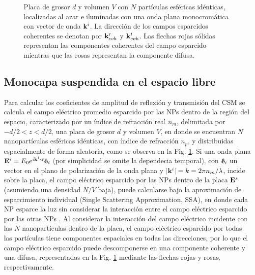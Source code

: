 \begin{figure}[h!]
	\caption{Placa de grosor $d$ y volumen $V$ con $N$ partículas esféricas  idénticas, localizadas al azar e iluminadas con una onda plana monocromática con vector de onda $\vb{k}^i$. La dirección de los campos esparcidos coherentes se denotan por $\vb{k}^r_{coh}$ y $\vb{k}^t_{coh}$. Las flechas rojas sólidas representan las componentes coherentes del campo esparcido mientras que las rosas representan la componente difusa. }\label{fig:CSM-Slab}
	\end{figure} 
 
\subsection{Monocapa suspendida en el espacio libre}
\label{ssection:FSM} 
 
Para calcular los coeficientes de amplitud de reflexión y transmisión del CSM se calcula el campo eléctrico promedio esparcido por las NPs dentro de la región del espacio, caracterizado por un índice de refracción real $n_m$, delimitada por  $-d/2<z<d/2$, una placa de grosor $d$ y volumen $V$, en donde se encuentran $N$ nanopartículas esféricas idénticas, con índice de refracción $n_p$, y distribuidas espacialmente de forma aleatoria, como se observa en la Fig. \ref{fig:CSM-Slab}. Si una onda plana $\vb{E}^i = E_0 e^{i\vb{k}^i\cdot\vb{r}}\vu{e}_i$ (por simplicidad se omite la dependecia temporal), con $\vu{e}_i$ un vector en el plano de polarización de la onda plana y $|\vb{k}^i| = k = 2\pi n_m /\lambda$, incide sobre la placa, el campo eléctrico esparcido  por las NPs dentro de la placa $\vb{E}^s$ (asumiendo una densidad $N/V$ baja), puede calcularse bajo la aproximación de esparcimiento individual (Single Scattering Approximation, SSA), en donde cada NP esparce la luz sin considerar la interacción entre el campo eléctrico esparcido por las otras NPs \cite{barrera2003coherent}. Al considerar la interacción del campo eléctrico incidente con las $N$ nanopartículas dentro de la placa, el campo eléctrico esparcido por todas las partículas tiene componentes espaciales en todas las direcciones, por lo que el campo eléctrico esparcido puede descomponerse en una componente coherente y una difusa, representadas en la Fig. \ref{fig:CSM-Slab} mediante las flechas rojas y rosas, respectivamente.


